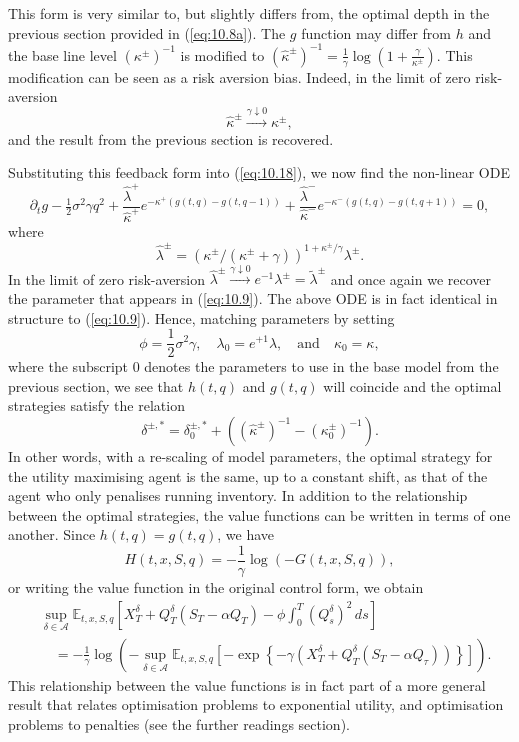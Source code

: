 \documentclass[11pt, a4paper]{book}
\newcommand{\E}{\mathbb{E}}
\begin{document}
	This form is very similar to, but slightly differs from, the optimal depth in the previous section provided in (\ref{eq:10.8a}). The $g$ function may differ from $h$ and the base line level $(\kappa^\pm)^{-1}$ is modified to $(\hat{\kappa}^\pm)^{-1} = \frac{1}{\gamma} \log(1 + \frac{\gamma}{\kappa^\pm})$. This modification can be seen as a risk aversion bias. Indeed, in the limit of zero risk-aversion
	\[
	\hat{\kappa}^\pm \xrightarrow{\gamma \downarrow 0} \kappa^\pm,
	\]
	and the result from the previous section is recovered.
	
	Substituting this feedback form into (\ref{eq:10.18}), we now find the non-linear ODE
	\[
	\partial_t g - \tfrac{1}{2}\sigma^2 \gamma q^2 + \frac{\hat{\lambda}^+}{\hat{\kappa}^+} e^{-\kappa^+ (g(t, q) - g(t, q-1))} + \frac{\hat{\lambda}^-}{\hat{\kappa}^-} e^{-\kappa^- (g(t, q) - g(t, q+1))} = 0,
	\]
	where
	\[
	\hat{\lambda}^\pm = \left( \kappa^\pm / (\kappa^\pm + \gamma) \right)^{1 + \kappa^\pm / \gamma} \lambda^\pm.
	\]
	In the limit of zero risk-aversion $\hat{\lambda}^\pm \xrightarrow{\gamma \downarrow 0} e^{-1}\lambda^\pm = \tilde{\lambda}^\pm$ and once again we recover the parameter that appears in (\ref{eq:10.9}). The above ODE is in fact identical in structure to (\ref{eq:10.9}). Hence, matching parameters by setting
	\[
	\phi = \frac{1}{2}\sigma^2 \gamma, \quad \lambda_0 = e^{+1} \hat{\lambda}, \quad \text{and} \quad \kappa_0 = \kappa,
	\]
	where the subscript 0 denotes the parameters to use in the base model from the previous section, we see that $h(t, q)$ and $g(t, q)$ will coincide and the optimal strategies satisfy the relation
	\begin{equation}
		\boxed{\delta^{\pm, *} = \delta^{\pm, *}_0 + \left( (\hat{\kappa}^\pm)^{-1} - (\kappa_0^\pm)^{-1} \right).} \label{eq:10.20}
	\end{equation}
	In other words, with a re-scaling of model parameters, the optimal strategy for the utility maximising agent is the same, up to a constant shift, as that of the agent who only penalises running inventory.
	In addition to the relationship between the optimal strategies, the value functions can be written in terms of one another. Since $h(t, q) = g(t, q)$, we have
	\[
	H(t, x, S, q) = -\frac{1}{\gamma} \log(-G(t, x, S, q)),
	\]
	or writing the value function in the original control form, we obtain
	\begin{equation}
		\boxed{
			\begin{aligned}
				&\sup_{\delta \in \mathcal{A}} \E_{t,x,S,q} \left[ X^\delta_T + Q^\delta_T (S_T - \alpha Q_T) - \phi \int_0^T (Q^\delta_s)^2 \, ds \right] \\
				&\quad = -\frac{1}{\gamma} \log \left( -\sup_{\delta \in \mathcal{A}} \E_{t,x,S,q} \left[ -\exp \left\{ -\gamma \left( X^\delta_T + Q^\delta_T (S_T - \alpha Q_\tau) \right) \right\} \right] \right).
			\end{aligned}
		} \label{eq:10.21}
	\end{equation}
	This relationship between the value functions is in fact part of a more general result that relates optimisation problems to exponential utility, and optimisation problems to penalties (see the further readings section).
	
\end{document}
